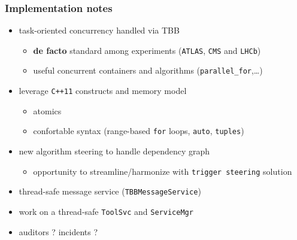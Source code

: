 \documentclass[9pt]{beamer}
\begin{document}
\begin{frame}[fragile]
\frametitle{Implementation notes}


\begin{itemize}
\item task-oriented concurrency handled via \alert{TBB}
\begin{itemize}
\item \textbf{de facto} standard among experiments (\verb~ATLAS~, \verb~CMS~ and \verb~LHCb~)
\item useful concurrent containers and algorithms (\verb~parallel_for~,\ldots{})
\end{itemize}
\item leverage \verb~C++11~ constructs and memory model
\begin{itemize}
\item atomics
\item confortable syntax (range-based \verb~for~ loops, \verb~auto~, \verb~tuples~)
\end{itemize}
\item new algorithm steering to handle dependency graph
\begin{itemize}
\item \alert{opportunity} to streamline/harmonize with \verb~trigger steering~ solution
\end{itemize}
\item thread-safe message service (\verb~TBBMessageService~)
\item work on a thread-safe \verb~ToolSvc~ and \verb~ServiceMgr~
\item auditors ? incidents ?
\end{itemize}
\end{frame}
\end{document}
